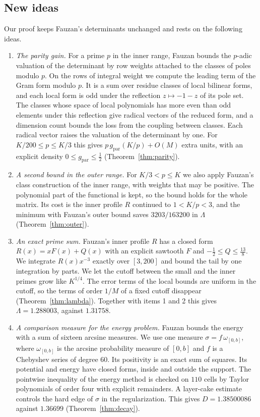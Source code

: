 \documentclass[11pt]{amsart}
\theoremstyle{definition}
\theoremstyle{remark}
\numberwithin{equation}{section}
\newcommand{\gref}{g_{\mathrm{par}}}
\begin{document}
\subsection{New ideas}
Our proof keeps Fauzan's determinants unchanged and rests on the following ideas.
\begin{enumerate}[leftmargin=*]
\item \emph{The parity gain.} For a prime $p$ in the inner range, Fauzan bounds the $p$-adic valuation of the
 determinant by row weights attached to the classes of poles modulo $p$. On the rows of integral weight we compute the
 leading term of the Gram form modulo $p$. It is a sum over residue classes of local bilinear forms, and each local form
 is odd under the reflection $z\mapsto-1-z$ of its pole set. The classes whose space of local polynomials has
 more even than odd elements under this reflection give radical vectors of the reduced form, and a dimension count
 bounds the loss from the coupling between classes. Each radical vector raises the valuation of the determinant by
 one. For $K/200\le p\le K/3$ this gives $p\,\gref(K/p)+O(M)$ extra
 units, with an explicit density $0\le\gref\le\frac12$ (Theorem~\ref{thm:parity}).
\item \emph{A second bound in the outer range.} For $K/3<p\le K$ we also apply Fauzan's class construction of the
 inner range, with weights that may be positive. The polynomial part of the functional is kept, so the bound holds for
 the whole matrix. Its cost is the inner profile $R$ continued to $1<K/p<3$, and the minimum with Fauzan's outer bound
 saves $3203/163200$ in $\Lambda$ (Theorem~\ref{thm:outer}).
\item \emph{An exact prime sum.} Fauzan's inner profile $R$ has a closed form $R(x)=xF(x)+Q(x)$ with an explicit
 sawtooth $F$ and $-\frac12\le Q\le\frac{13}8$. We integrate $R(x)x^{-3}$ exactly over $[3,200]$ and bound the tail by
 one integration by parts. We let the cutoff between the small and the inner primes grow like $K^{1/4}$. The error terms
 of the local bounds are uniform in the cutoff, so the terms of order $1/M$ of a fixed cutoff disappear
 (Theorem~\ref{thm:lambda}). Together with items 1 and 2 this gives $\Lambda=1.288003$, against $1.31758$.
\item \emph{A comparison measure for the energy problem.} Fauzan bounds the energy with a sum of sixteen arcsine
 measures. We use one measure $\sigma=f\,\omega_{[0,b]}$, where $\omega_{[0,b]}$ is the arcsine probability measure of
 $[0,b]$ and $f$ is a Chebyshev series of degree $60$. Its positivity is an exact sum of squares. Its potential and
 energy have closed forms, inside and outside the support. The pointwise inequality of the energy method is checked on
 $110$ cells by Taylor polynomials of order four with explicit remainders. A layer-cake estimate controls the hard edge
 of $\sigma$ in the regularization. This gives $D=1.38500086$ against $1.36699$ (Theorem~\ref{thm:decay}).
\end{enumerate}
\end{document}
